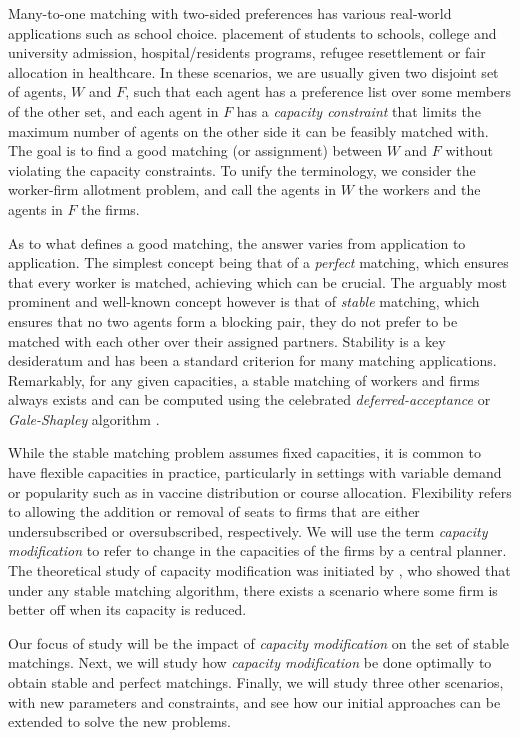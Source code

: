 Many-to-one matching with two-sided preferences has various real-world applications such as school choice. \ie placement of students to schools, college and university admission, hospital/residents programs, refugee resettlement or fair allocation in healthcare. In these scenarios, we are usually given two disjoint set of agents, $W$ and $F$, such that each agent has a preference list over some members of the other set, and each agent in $F$ has a \textit{capacity constraint} that limits the maximum number of agents on the other side it can be feasibly matched with. The
goal is to find a good matching (or assignment) between $W$ and $F$ without violating the capacity constraints. To unify the terminology, we consider the worker-firm allotment problem, and call the agents in $W$ the workers and the agents in $F$ the firms.

As to what defines a good matching, the answer varies from application to application. The simplest concept being that of a \textit{perfect} matching, which ensures that every worker is matched, achieving which can be crucial. The arguably most prominent and well-known concept however is that of \textit{stable} \cite{gale1962college, gusfield1989stable} matching, which ensures that no two agents form a blocking pair, \ie they do not prefer to be matched with each other over their assigned partners. Stability is a key desideratum and has been a standard criterion for many matching applications. Remarkably, for any given capacities, a stable matching of workers and firms always exists and can be computed using the celebrated \textit{deferred-acceptance} or \textit{Gale-Shapley} algorithm \cite{gale1962college, roth1984evolution}.

While the stable matching problem assumes fixed capacities, it is common to have flexible capacities in practice, particularly in settings with variable demand or popularity such as in vaccine distribution or course allocation. Flexibility refers to allowing the addition or removal of seats to firms that are either undersubscribed or oversubscribed, respectively. We will use the term \textit{capacity modification} to refer to change in the capacities of the firms by a central planner. The theoretical study of capacity modification was initiated by  \cite{sonmez1997manipulation}, who showed that under any stable matching algorithm, there exists a scenario where some firm is better off when its capacity is reduced.

Our focus of study will be the impact of \textit{capacity modification} on the set of stable matchings. Next, we will study how \textit{capacity modification} be done optimally to obtain stable and perfect matchings. Finally, we will study three other scenarios, with new parameters and constraints, and see how our initial approaches can be extended to solve the new problems.

